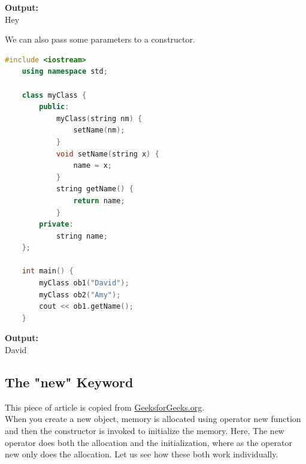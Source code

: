 \documentclass[12pt , a4paper]{article}
\begin{document}
	\begin{tcolorbox}
	\textbf{Output:}\\
	Hey
	\end{tcolorbox}
	We can also pass some parameters to a constructor.
	\begin{lstlisting}[language=C++]
	#include <iostream>
	using namespace std;
	
	class myClass {
	    public:
	        myClass(string nm) {
	            setName(nm);
	        }
	        void setName(string x) {
	            name = x;
	        }
	        string getName() {
	            return name;
	        }
	    private:
	        string name;
	};
	
	int main() {
	    myClass ob1("David");
	    myClass ob2("Amy");
	    cout << ob1.getName();
	}

	\end{lstlisting}

	\begin{tcolorbox}
	\textbf{Output:}\\
	David
	\end{tcolorbox}
	\subsection{The "new" Keyword}
	This piece of article is copied from \href{https://www.geeksforgeeks.org/new-vs-operator-new-in-cpp/}{GeeksforGeeks.org}.\\
	When you create a new object, memory is allocated using operator new function and then the constructor is invoked to initialize the memory. Here, The new operator does both the allocation and the initialization, where as the operator new only does the allocation.
	Let us see how these both work individually.

\end{document}
